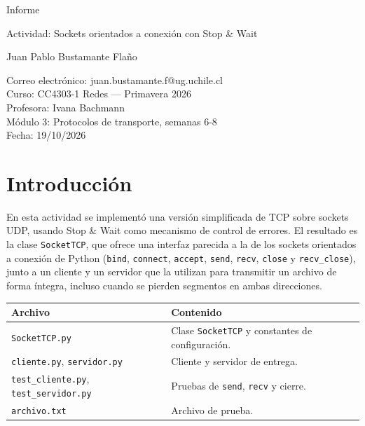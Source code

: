 \documentclass[11pt,letterpaper]{article}
\newcommand{\curso}{CC4303-1 Redes}
\newcommand{\tituloinforme}{Actividad: Sockets orientados a conexión con Stop \& Wait}
\begin{document}
\begin{titlepage}
  \thispagestyle{portada}
  \centering
  \vspace*{5cm}
  {\LARGE Informe\par}
  \vspace{0.3cm}
  {\Large \tituloinforme\par}
  \vspace{0.4cm}
  {\large Juan Pablo Bustamante Flaño\par}
  \vfill
  Correo electrónico: juan.bustamante.f@ug.uchile.cl\\
  Curso: \curso{} --- Primavera 2026\\
  Profesora: Ivana Bachmann\\
  Módulo 3: Protocolos de transporte, semanas 6-8\\
  Fecha: 19/10/2026
  \vspace*{3cm}
\end{titlepage}

\section{Introducción}

En esta actividad se implementó una versión simplificada de TCP sobre sockets UDP,
usando Stop \& Wait como mecanismo de control de errores. El resultado es la clase
\texttt{SocketTCP}, que ofrece una interfaz parecida a la de los sockets orientados a
conexión de Python (\texttt{bind}, \texttt{connect}, \texttt{accept}, \texttt{send},
\texttt{recv}, \texttt{close} y \texttt{recv\_close}), junto a un cliente y un servidor
que la utilizan para transmitir un archivo de forma íntegra, incluso cuando se pierden
segmentos en ambas direcciones.

\begin{center}
\begin{tabular}{@{}ll@{}}
  \toprule
  Archivo & Contenido \\
  \midrule
  \texttt{SocketTCP.py} & Clase \texttt{SocketTCP} y constantes de configuración. \\
  \texttt{cliente.py}, \texttt{servidor.py} & Cliente y servidor de entrega. \\
  \texttt{test\_cliente.py}, \texttt{test\_servidor.py} & Pruebas de \texttt{send}, \texttt{recv} y cierre. \\
  \texttt{archivo.txt} & Archivo de prueba. \\
  \bottomrule
\end{tabular}
\end{center}
\end{document}

